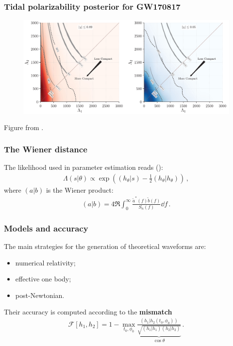 \documentclass{beamer}
\begin{document}
\begin{frame}
    \frametitle{Tidal polarizability posterior for GW170817}   
    \begin{figure}[ht]
    \centering
    \includegraphics[width=\textwidth]{figures/GW170817_tidal}
    \label{fig:GW170817_tidal}
    \end{figure}
    Figure from \cite{abbottGW170817ObservationGravitational2017}.
\end{frame}

\begin{frame}
    \frametitle{The Wiener distance}
    
    The likelihood used in parameter estimation reads (\cite[]{maggioreGravitationalWavesVolume2007}): 
    \begin{align}
    \Lambda (s | \theta ) \propto \exp( (h_\theta | s) - \frac{1}{2} (h_\theta | h_\theta ))
    \,,
    \end{align}
    where \((a | b)\) is the Wiener product: 
    \begin{align}
    (a | b) = 4 \Re \int_{0}^{\infty } \frac{\widetilde{a}^{*}(f) \widetilde{b} (f)}{S_n (f)} \dd{f}
    \,.
    \end{align}
\end{frame}

\begin{frame}
    \frametitle{Models and accuracy}
    The main strategies for the generation of theoretical waveforms are: 
    \begin{itemize}
        \item numerical relativity;
        \item effective one body;
        \item post-Newtonian.
    \end{itemize}
    
    Their accuracy is computed according to the \textbf{mismatch}
    \begin{align}
        \mathcal{F}[h_1, h_2 ] = 1 - \max_{t_0 , \phi_0 } \underbrace{\frac{(h_1 | h_2 (t_0, \phi_0 ))}{\sqrt{(h_1 | h_1 ) (h_2 | h_2 )}}}_{\cos \theta }
        \,.
    \end{align}
\end{frame}
\end{document}
